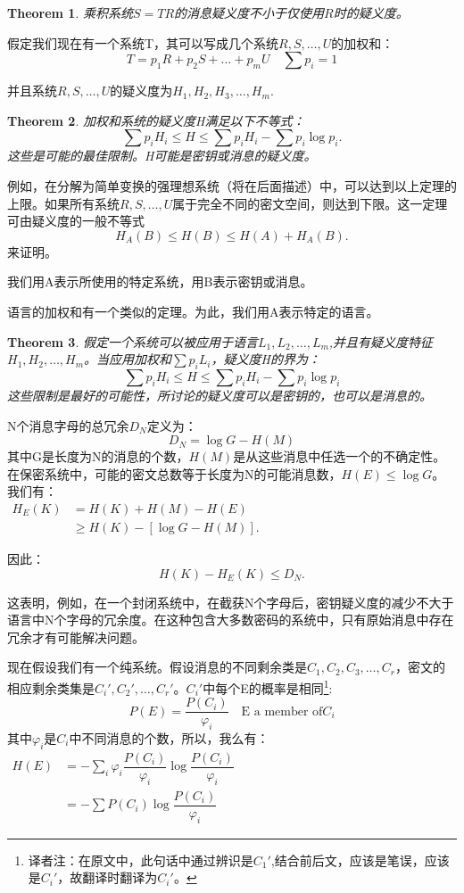 \documentclass[]{article}
\newtheorem{theorem}{Theorem}
\begin{document}
\begin{theorem}
	乘积系统$S=TR$的消息疑义度不小于仅使用$R$时的疑义度。
\end{theorem}

假定我们现在有一个系统T，其可以写成几个系统$R,S,\ldots,U$的加权和：
\[T=p_1 R+p_2 S+\ldots+p_m U \quad \sum {p_i}=1\]

并且系统$R,S,\ldots,U$的疑义度为$H_1,H_2,H_3,\ldots,H_m$.

\begin{theorem}
	加权和系统的疑义度H满足以下不等式：
	\[\sum {p_i H_i} \leq H \leq \sum {p_i H_i} -\sum {p_i\log{p_i}}.\]
	这些是可能的最佳限制。H可能是密钥或消息的疑义度。
\end{theorem}

例如，在分解为简单变换的强理想系统（将在后面描述）中，可以达到以上定理的上限。如果所有系统$R,S,\ldots,U$属于完全不同的密文空间，则达到下限。这一定理可由疑义度的一般不等式
\[H_A(B)\leq H(B) \leq H(A)+H_A(B).\]
来证明。

我们用A表示所使用的特定系统，用B表示密钥或消息。

语言的加权和有一个类似的定理。为此，我们用A表示特定的语言。

\begin{theorem}
	假定一个系统可以被应用于语言$L_1,L_2,\ldots,L_m$,并且有疑义度特征$H_1,H_2,\ldots,H_m$。当应用加权和$\sum {p_i L_i}$，疑义度H的界为：
	\[\sum {p_i H_i} \leq H \leq \sum {p_i H_i}-\sum {p_i \log{p_i}}\]
	这些限制是最好的可能性，所讨论的疑义度可以是密钥的，也可以是消息的。
\end{theorem}

N个消息字母的总冗余$D_N$定义为：
\[D_N=\log{G} -H(M)\]
其中G是长度为N的消息的个数，$H(M)$是从这些消息中任选一个的不确定性。在保密系统中，可能的密文总数等于长度为N的可能消息数，$H(E)\leq \log{G}$。我们有：\\
$\begin{matrix}
	H_E(K) & =H(K)+H(M)-H(E)\\
	       & \geq H(K)- [\log{G}-H(M)].
\end{matrix}$

因此：
\[H(K)-H_E(K)\leq D_N.\]

这表明，例如，在一个封闭系统中，在截获N个字母后，密钥疑义度的减少不大于语言中N个字母的冗余度。在这种包含大多数密码的系统中，只有原始消息中存在冗余才有可能解决问题。

现在假设我们有一个纯系统。假设消息的不同剩余类是$C_1,C_2,C_3,\ldots,C_r$，密文的相应剩余类集是$C_i',C_2',\ldots,C_r'$。$C_i'$中每个E的概率是相同\footnote{译者注：在原文中，此句话中通过辨识是$C_1'$,结合前后文，应该是笔误，应该是$C_i'$，故翻译时翻译为$C_i'$。}:
\[P(E)=\dfrac{P(C_i)}{\varphi_i}\quad \text{E a member of} C_i\]
其中$\varphi_i$是$C_i$中不同消息的个数，所以，我么有：\\
$\begin{matrix}
H(E) & = -\sum_{i}{\varphi_i \dfrac{P(C_i)}{\varphi_i} \log{\dfrac{P(C_i)}{\varphi_i}}}\\
     & = -\sum {P(C_i)\log{\dfrac{P(C_i)}{\varphi_i}}} 
\end{matrix}$
\end{document}
